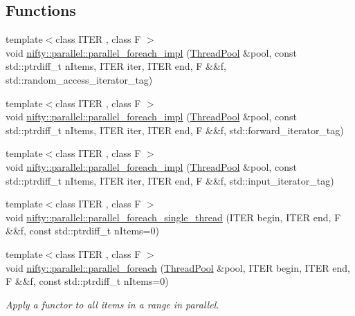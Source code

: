 \subsection*{Functions}
\begin{DoxyCompactItemize}
\item 
{\footnotesize template$<$class I\+T\+ER , class F $>$ }\\void \hyperlink{group__ParallelProcessing_ga7604490d8cf7a5b53de4477c866c8b86}{nifty\+::parallel\+::parallel\+\_\+foreach\+\_\+impl} (\hyperlink{classnifty_1_1parallel_1_1ThreadPool}{Thread\+Pool} \&pool, const std\+::ptrdiff\+\_\+t n\+Items, I\+T\+ER iter, I\+T\+ER end, F \&\&f, std\+::random\+\_\+access\+\_\+iterator\+\_\+tag)
\item 
{\footnotesize template$<$class I\+T\+ER , class F $>$ }\\void \hyperlink{group__ParallelProcessing_gab81648beb53aff67df1822f993b49ad1}{nifty\+::parallel\+::parallel\+\_\+foreach\+\_\+impl} (\hyperlink{classnifty_1_1parallel_1_1ThreadPool}{Thread\+Pool} \&pool, const std\+::ptrdiff\+\_\+t n\+Items, I\+T\+ER iter, I\+T\+ER end, F \&\&f, std\+::forward\+\_\+iterator\+\_\+tag)
\item 
{\footnotesize template$<$class I\+T\+ER , class F $>$ }\\void \hyperlink{group__ParallelProcessing_ga402d9e45f8edf065e6775e76a447f72e}{nifty\+::parallel\+::parallel\+\_\+foreach\+\_\+impl} (\hyperlink{classnifty_1_1parallel_1_1ThreadPool}{Thread\+Pool} \&pool, const std\+::ptrdiff\+\_\+t n\+Items, I\+T\+ER iter, I\+T\+ER end, F \&\&f, std\+::input\+\_\+iterator\+\_\+tag)
\item 
{\footnotesize template$<$class I\+T\+ER , class F $>$ }\\void \hyperlink{group__ParallelProcessing_ga53b7128ccb1cf52e5646440337ce4ece}{nifty\+::parallel\+::parallel\+\_\+foreach\+\_\+single\+\_\+thread} (I\+T\+ER begin, I\+T\+ER end, F \&\&f, const std\+::ptrdiff\+\_\+t n\+Items=0)
\item 
{\footnotesize template$<$class I\+T\+ER , class F $>$ }\\void \hyperlink{group__ParallelProcessing_ga505ac3d12ecde87341bce7b6f1027c88}{nifty\+::parallel\+::parallel\+\_\+foreach} (\hyperlink{classnifty_1_1parallel_1_1ThreadPool}{Thread\+Pool} \&pool, I\+T\+ER begin, I\+T\+ER end, F \&\&f, const std\+::ptrdiff\+\_\+t n\+Items=0)
\begin{DoxyCompactList}\small\item\em Apply a functor to all items in a range in parallel. \end{DoxyCompactList}\item 

\end{DoxyCompactItemize}
